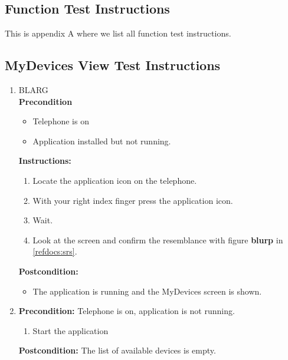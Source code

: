 \documentclass[a4paper]{article}
\newlength{\testlabellength}
\newenvironment{testlist}{\begin{enumerate}[label=\bfseries Instruction \thesubsection.\arabic* , labelindent=0pt, labelwidth=\testlabellength , leftmargin=2cm]}{\end{enumerate}}
\newenvironment{precondition}{
{\color{white}BLARG}\\ 
\textbf{Precondition}
\begin{itemize}[labelindent=0cm, labelwidth=2cm , leftmargin=1cm]
}
{\end{itemize}}
\newenvironment{instruction}{
\textbf{Instructions:}
\begin{enumerate}[label=\bfseries  \arabic*., labelindent=0cm, labelwidth=2cm , leftmargin=1cm]
}
{\end{enumerate}}
\newenvironment{postcondition}{
\textbf{Postcondition:}
\begin{itemize}[labelindent=0cm, labelwidth=2cm , leftmargin=1cm]
}
{\end{itemize}}
\begin{document}
\newpage
\begin{appendices}

\section{Function Test Instructions} \label{appendix:section:functiontest}
This is appendix A where we list all function test instructions.

\subsection{MyDevices View Test Instructions}
\begin{testlist}

    \item 
    	\begin{precondition}
    		\item Telephone is on
    		\item Application installed but not running.
    	\end{precondition}
    	\begin{instruction}
    		\item Locate the application icon on the telephone.
    		\item With your right index finger press the application icon.
	    	\item Wait.
    		\item Look at the screen and confirm the resemblance with figure \textbf{blurp} in \ref{refdocs:srs}.
    	\end{instruction}
    	\begin{postcondition}
    		\item The application is running and the MyDevices screen is shown.
    	\end{postcondition}
    
	\item \vspace{5mm} \textbf{Precondition:} Telephone is on, application is not running.
    			\begin{enumerate}
                	\item Start the application
                \end{enumerate}
                \textbf{Postcondition:} The list of available devices is empty.
    

\end{testlist}
\end{appendices}
\end{document}
